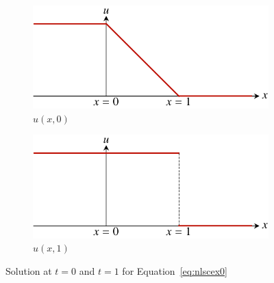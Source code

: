 \begin{figure}[htbp]
	\centering
	\begin{subfigure}[b]{0.49\linewidth}
	\includegraphics[width=\linewidth]{Pictures/nonlinear_scalar_example_u0}
	\caption{$u(x,0)$}
	\label{fig:nslcexa}
	\end{subfigure}
	\begin{subfigure}[b]{0.49\linewidth}
		\includegraphics[width=\linewidth]{Pictures/nonlinear_scalar_example_uf}
		\caption{$u(x,1)$}
	\label{fig:nslcexb}
	\end{subfigure}
	\caption{Solution at $t=0$ and $t=1$ for Equation~\ref{eq:nlscex0}}
	\label{fig:nslcex}
\end{figure}

